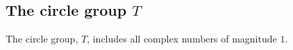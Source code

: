 
\subsection{The circle group \(T\)}

The circle group, \(T\), includes all complex numbers of magnitude \(1\).

